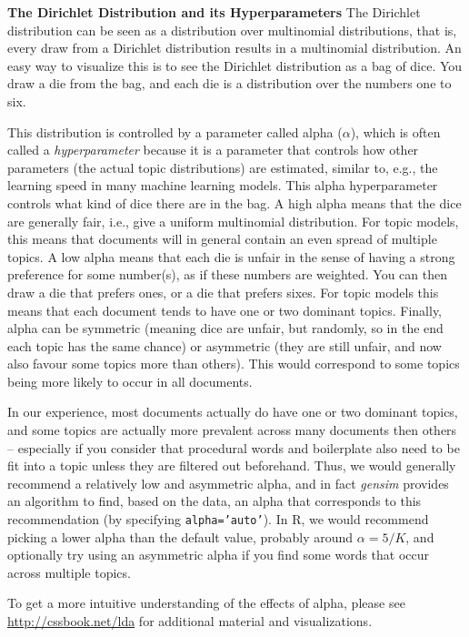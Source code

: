 \begin{feature}
  \textbf{The Dirichlet Distribution and its Hyperparameters}
  The Dirichlet distribution can be seen as a distribution over multinomial distributions,
  that is, every draw from a Dirichlet distribution results in a multinomial distribution.
  An easy way to visualize this is to see the Dirichlet distribution as a bag of dice.
  You draw a die from the bag, and each die is a distribution over the numbers one to six.

  This distribution is controlled by a parameter called alpha ($\alpha$),
  which is often called a \emph{hyperparameter} because it is a parameter that controls how other parameters
  (the actual topic distributions) are estimated, similar to, e.g., the learning speed in many machine learning models.
  This alpha hyperparameter controls what kind of dice there are in the bag.
  A high alpha means that the dice are generally fair, i.e., give a uniform multinomial distribution.
  For topic models, this means that documents will in general contain an even spread of multiple topics.
  A low alpha means that each die is unfair in the sense of having a strong preference for some number(s), as if these numbers are weighted. You can then draw a die that prefers ones, or a die that prefers sixes.
  For topic models this means that each document tends to have one or two dominant topics.
  Finally, alpha can be symmetric (meaning dice are unfair, but randomly, so in the end each topic has the same chance)
  or asymmetric (they are still unfair, and now also favour some topics more than others).
  This would correspond to some topics being more likely to occur in all documents.

  In our experience, most documents actually do have one or two dominant topics,
  and some topics are actually more prevalent across many documents then others
  -- especially if you consider that procedural words and boilerplate also need to be fit into a topic unless they are filtered out beforehand.
  Thus, we would generally recommend a relatively low and asymmetric alpha,
  and in fact \emph{gensim} provides an algorithm to find, based on the data, an alpha that corresponds to this recommendation (by specifying \texttt{alpha='auto'}).
  In R, we would recommend picking a lower alpha than the default value, probably around $\alpha=5/K$,
  and optionally try using an asymmetric alpha if you find some words that occur across multiple topics.

  To get a more intuitive understanding of the effects of alpha,
  please see \url{http://cssbook.net/lda} for additional material and visualizations.
\end{feature}

